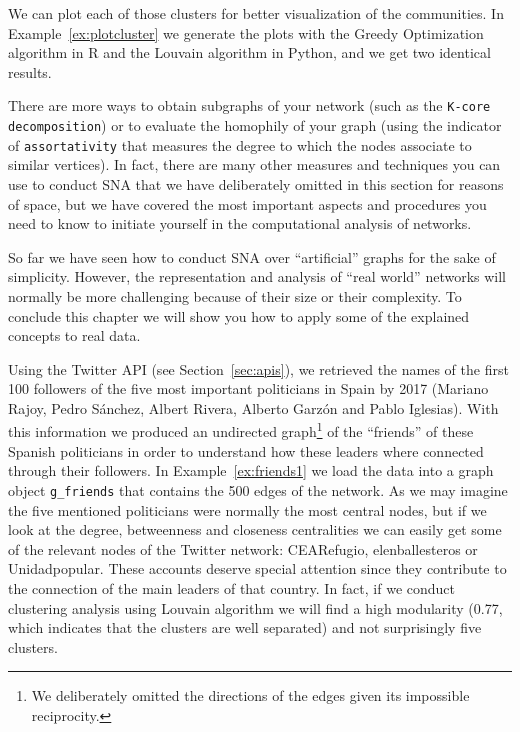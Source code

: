 
We can plot each of those clusters for better visualization of the communities. In Example~\ref{ex:plotcluster} we generate the plots with the Greedy Optimization algorithm in R and the Louvain algorithm in Python, and we get two identical results.


There are more ways to obtain subgraphs of your network (such as the \texttt{K-core decomposition}) or to evaluate the homophily of your graph (using the indicator of \texttt{assortativity} that measures the degree to which the nodes associate to similar vertices). In fact, there are many other measures and techniques you can use to conduct SNA that we have deliberately omitted in this section for reasons of space, but we have covered the most important aspects and procedures you need to know to initiate yourself in the computational analysis of networks.

So far we have seen how to conduct SNA over ``artificial'' graphs for the sake of simplicity. However, the representation and analysis of ``real world'' networks will normally be more challenging because of their size or their complexity. To conclude this chapter we will show you how to apply some of the explained concepts to real data.

Using the Twitter API (see Section~\ref{sec:apis}), we retrieved the names of the first 100 followers of the five most important politicians in Spain by 2017 (Mariano Rajoy, Pedro S\'anchez, Albert Rivera, Alberto Garz\'on and Pablo Iglesias). With this information we produced an undirected graph\footnote{We deliberately omitted the directions of the edges given its impossible reciprocity.} of the ``friends'' of these Spanish politicians in order to understand how these leaders where connected through their followers. In Example~\ref{ex:friends1} we load the data into a graph object \texttt{g\_friends} that contains the 500 edges of the network. As we may imagine the five mentioned politicians were normally the most central nodes, but if we look at the degree, betweenness and closeness centralities we can easily get some of the relevant nodes of the Twitter network: CEARefugio, elenballesteros or Unidadpopular. These accounts deserve special attention since they contribute to the connection of the main leaders of that country. In fact, if we conduct clustering analysis using Louvain algorithm we will find a high modularity (0.77, which indicates that the clusters are well separated) and not surprisingly five clusters.

